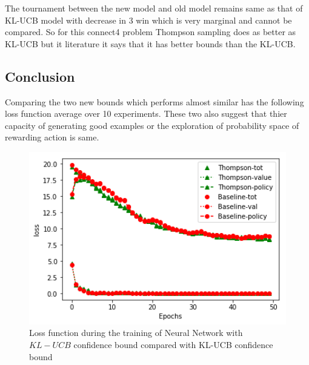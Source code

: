 The tournament between the new model and old model remains same as that of KL-UCB model with decrease in 3 win which is very marginal and cannot be compared. So for this connect4 problem Thompson sampling does as better as KL-UCB but it literature it says that it has better bounds than the KL-UCB.

\subsection{Conclusion}
Comparing the two new bounds which performs almost similar has the following loss function average over 10 experiments. These two also suggest that thier capacity of generating good examples or the exploration of probability space of rewarding action is same.

\begin{figure}
 	[!htb]\centering
    \includegraphics[width=6in]{images/kl-ucbVSthompson.png}
    \caption{Loss function during the training of Neural Network with $KL-UCB$ confidence bound compared with KL-UCB confidence bound}
  \label{fig:phase}
  \end{figure}
























